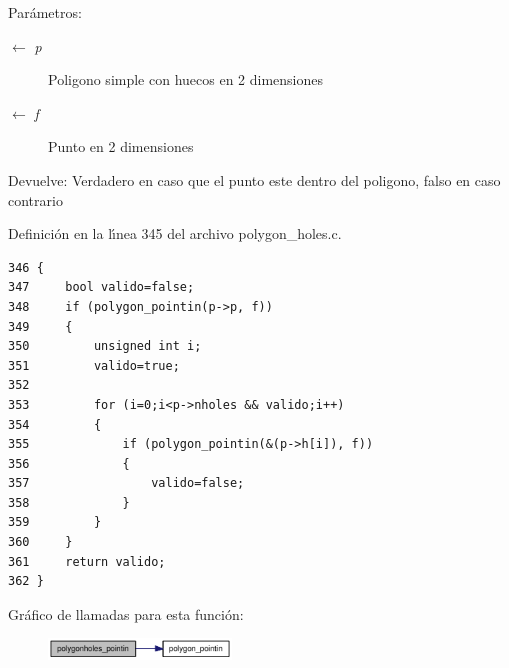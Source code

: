 \begin{Desc}
\item[Par\'{a}metros:]
\begin{description}
\item[\mbox{$\leftarrow$} {\em p}]Poligono simple con huecos en 2 dimensiones \item[\mbox{$\leftarrow$} {\em f}]Punto en 2 dimensiones \end{description}
\end{Desc}
\begin{Desc}
\item[Devuelve:]Verdadero en caso que el punto este dentro del poligono, falso en caso contrario \end{Desc}


Definici\'{o}n en la l\'{\i}nea 345 del archivo polygon\_\-holes.c.

\begin{Code}\begin{verbatim}346 {
347     bool valido=false;
348     if (polygon_pointin(p->p, f))
349     {
350         unsigned int i;
351         valido=true;
352 
353         for (i=0;i<p->nholes && valido;i++)
354         {
355             if (polygon_pointin(&(p->h[i]), f))
356             {
357                 valido=false;
358             }
359         }
360     }
361     return valido;
362 }
\end{verbatim}\end{Code}




Gr\'{a}fico de llamadas para esta funci\'{o}n:\begin{figure}[H]
\begin{center}
\leavevmode
\includegraphics[width=138pt]{group__geometry_g35a6dd45f6d0cbed26ef8a69ed34a2e9_g35a6dd45f6d0cbed26ef8a69ed34a2e9_cgraph}
\end{center}
\end{figure}


